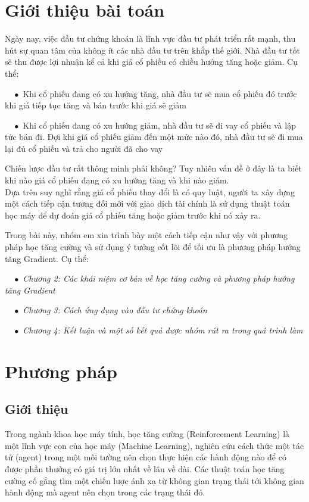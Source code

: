 \documentclass[14pt]{extreport}
\begin{document}
\tableofcontents
\newpage


\newpage
\chapter{Giới thiệu bài toán}

Ngày nay, việc đầu tư chứng khoán là lĩnh vực đầu tư phát triển rất mạnh, thu hút sự quan tâm của không ít các nhà đầu tư trên khắp thế giới. Nhà đầu tư tốt sẽ thu được lợi nhuận kể cả khi giá cổ phiếu có chiều hướng tăng hoặc giảm. Cụ thể:

$\quad \bullet$ Khi cổ phiếu đang có xu hướng tăng, nhà đầu tư sẽ mua cổ phiếu đó trước khi giá tiếp tục tăng và bán trước khi giá sẽ giảm

$\quad \bullet$ Khi cổ phiếu đang có xu hướng giảm, nhà đầu tư sẽ đi vay cổ phiếu và lập tức bán đi. Đợi khi giá cổ phiếu giảm đến một mức nào đó, nhà đầu tư sẽ đi mua lại đủ cổ phiếu và trả cho người đã cho vay

Chiến lược đầu tư rất thông minh phải không? Tuy nhiên vấn đề ở đây là ta biết khi nào giá cổ phiếu đang có xu hướng tăng và khi nào giảm.
\\ 

Dựa trên suy nghĩ rằng giá cổ phiếu thay đổi là có quy luật, người ta xây dựng một cách tiếp cận tương đối mới với giao dịch tài chính là sử dụng thuật toán học máy để dự đoán giá cổ phiếu tăng hoặc giảm trước khi nó xảy ra.

Trong bài này, nhóm em xin trình bày một cách tiếp cận như vậy với phương pháp học tăng cường và sử dụng ý tưởng cốt lõi để tối ưu là phương pháp hướng tăng Gradient. Cụ thể:

$\quad \bullet$ \textit{Chương 2: Các khái niệm cơ bản về học tăng cường và phương pháp hướng tăng Gradient}

$\quad \bullet$ \textit{Chương 3: Cách ứng dụng vào đầu tư chứng khoán}

$\quad \bullet$ \textit{Chương 4: Kết luận và một số kết quả được nhóm rút ra trong quá trình làm}

\chapter{Phương pháp}
\section{Giới thiệu}

 Trong ngành khoa học máy tính, học tăng cường (Reinforcement Learning) là một lĩnh vực con của học máy (Machine Learning), nghiên cứu cách thức một tác tử (agent) trong một môi tường nên chọn thực hiện các hành động nào để có được phần thưởng có giá trị lớn nhất về lâu về dài. Các thuật toán học tăng cường cố gắng tìm một chiến lược ánh xạ từ không gian trạng thái tới không gian hành động mà agent nên chọn trong các trạng thái đó.
 
\end{document}
